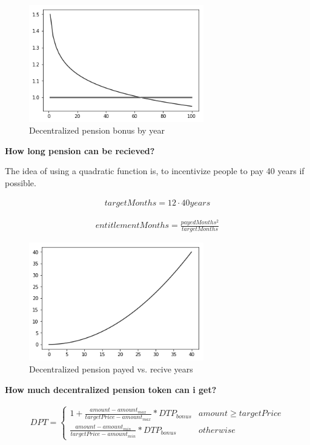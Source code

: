 \begin{figure}[H]
    \centering
    \includegraphics[width=3.0in]{pension_bonus.png}
    \caption{Decentralized pension bonus by year}
    \label{fig:pension_bonus}
\end{figure}

\textbf{How long pension can be recieved?}

The idea of using a quadratic function is, to incentivize people to pay 40 years if possible.

\begin{eqnarray}
	targetMonths =  12 \cdot 40 years
\end{eqnarray}

\begin{eqnarray}
	entitlementMonths = \frac{payedMonths^2}{targetMonths}
\end{eqnarray}

\begin{figure}[H]
    \centering
    \includegraphics[width=3.0in]{pension_years.png}
    \caption{Decentralized pension payed vs. recive years}
    \label{fig:pension_years}
\end{figure}

\textbf{How much decentralized pension token can i get?}

\begin{eqnarray}
	DPT = \begin{cases} 1 + \frac{amount-amount_{max}}
	{targetPrice - amount_{max}} 
	* DTP_{bonus} & amount \geq targetPrice\\
	\frac{amount - amount_{min}}
	{targetPrice - amount_{min}} 
	* DTP_{bonus} & otherwise\end{cases}
\end{eqnarray}

